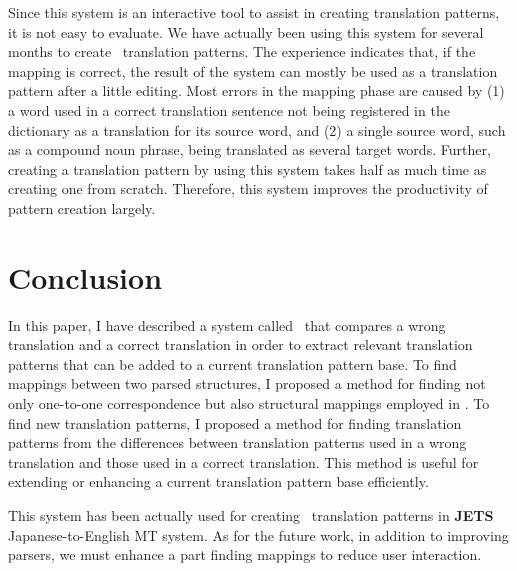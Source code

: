 Since this system is an interactive tool to assist in creating translation
patterns, it is not easy to evaluate. We have actually been using this system for
several months to create \SimTran\ translation patterns. The experience
indicates that, if the mapping is correct, the result of the system can mostly
be used as a translation pattern after a little editing.  Most errors in the
mapping phase are caused by (1) a word used in a correct translation sentence
not being registered in the dictionary as a translation for its source word,
and (2) a single source word, such as a compound noun phrase, being translated
as several target words.  Further, creating a translation pattern by using
this system takes half as much time as creating one from scratch.
Therefore, this system improves the productivity of pattern creation largely.

\section{Conclusion}


In this paper, I have described a system called \TranPet\ that compares a
wrong translation and a correct translation in order to extract relevant
translation patterns that can be added to a current translation pattern base. 
To find mappings between two parsed structures, I proposed a method for
finding not only one-to-one correspondence but also structural mappings
employed in \SimTran. To find new translation patterns, I proposed a method
for finding translation patterns from the differences between translation
patterns used in a wrong translation and those used in a correct translation. 
This method is useful for extending or enhancing a current translation pattern
base efficiently.

This system has been actually used for creating \SimTran\ translation patterns
in {\bf JETS} Japanese-to-English MT system. As for the future work,
in addition to improving parsers, we must enhance a part finding mappings
to reduce user interaction.



